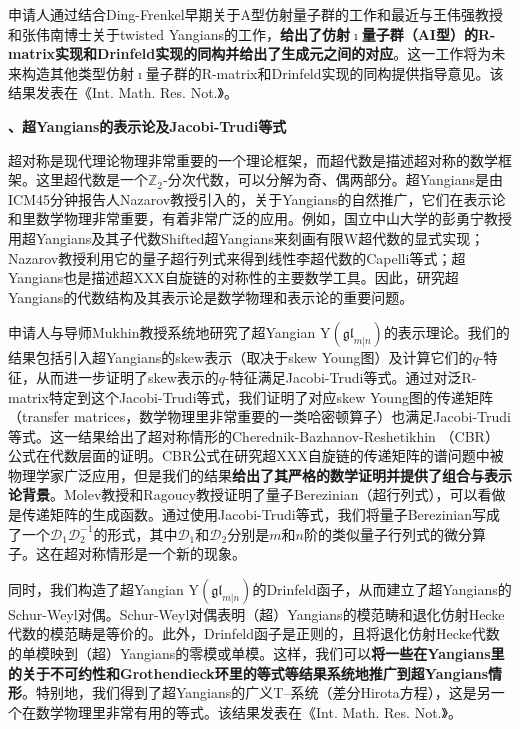 \documentclass[12pt,UTF8,AutoFakeBold=4,a4paper]{ctexart}
\begin{document}
申请人通过结合Ding-Frenkel早期关于A型仿射量子群的工作和最近与王伟强教授和张伟南博士关于twisted Yangians的工作，\textbf{给出了仿射$\imath$量子群（AI型）的R-matrix实现和Drinfeld实现的同构并给出了生成元之间的对应}。这一工作将为未来构造其他类型仿射$\imath$量子群的R-matrix和Drinfeld实现的同构提供指导意见。该结果发表在《Int. Math. Res. Not.》。

\medskip

\textbf{、超Yangians的表示论及Jacobi-Trudi等式}

超对称是现代理论物理非常重要的一个理论框架，而超代数是描述超对称的数学框架。这里超代数是一个$\mathbb Z_2$-分次代数，可以分解为奇、偶两部分。超Yangians是由ICM45分钟报告人Nazarov教授引入的，关于Yangians的自然推广，它们在表示论和里数学物理非常重要，有着非常广泛的应用。例如，国立中山大学的彭勇宁教授用超Yangians及其子代数Shifted超Yangians来刻画有限W超代数的显式实现；Nazarov教授利用它的量子超行列式来得到线性李超代数的Capelli等式；超Yangians也是描述超XXX自旋链的对称性的主要数学工具。因此，研究超Yangians的代数结构及其表示论是数学物理和表示论的重要问题。

申请人与导师Mukhin教授系统地研究了超Yangian $\mathrm{Y}(\mathfrak{gl}_{m|n})$的表示理论。我们的结果包括引入超Yangians的skew表示（取决于skew Young图）及计算它们的$q$-特征，从而进一步证明了skew表示的$q$-特征满足Jacobi-Trudi等式。通过对泛R-matrix特定到这个Jacobi-Trudi等式，我们证明了对应skew Young图的传递矩阵（transfer matrices，数学物理里非常重要的一类哈密顿算子）也满足Jacobi-Trudi等式。这一结果给出了超对称情形的Cherednik-Bazhanov-Reshetikhin （CBR）公式在代数层面的证明。CBR公式在研究超XXX自旋链的传递矩阵的谱问题中被物理学家广泛应用，但是我们的结果\textbf{给出了其严格的数学证明并提供了组合与表示论背景}。Molev教授和Ragoucy教授证明了量子Berezinian（超行列式），可以看做是传递矩阵的生成函数。通过使用Jacobi-Trudi等式，我们将量子Berezinian写成了一个$\mathcal D_1\mathcal D_2^{-1}$的形式，其中$\mathcal D_1$和$\mathcal D_2$分别是$m$和$n$阶的类似量子行列式的微分算子。这在超对称情形是一个新的现象。

同时，我们构造了超Yangian $\mathrm{Y}(\mathfrak{gl}_{m|n})$的Drinfeld函子，从而建立了超Yangians的Schur-Weyl对偶。Schur-Weyl对偶表明（超）Yangians的模范畴和退化仿射Hecke代数的模范畴是等价的。此外，Drinfeld函子是正则的，且将退化仿射Hecke代数的单模映到（超）Yangians的零模或单模。这样，我们可以\textbf{将一些在Yangians里的关于不可约性和Grothendieck环里的等式等结果系统地推广到超Yangians情形}。特别地，我们得到了超Yangians的广义T--系统（差分Hirota方程），这是另一个在数学物理里非常有用的等式。该结果发表在《Int. Math. Res. Not.》。
\end{document}
